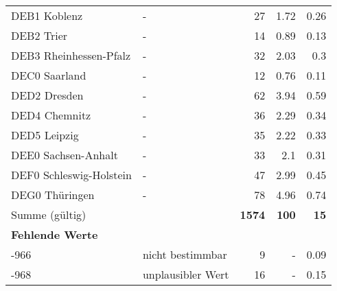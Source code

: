 \begin{longtable}{Xlrrr}
        \multicolumn{1}{X}{DEB1 Koblenz} & - & \num{27} & \num[round-mode=places,round-precision=2]{1.72} & \num[round-mode=places,round-precision=2]{0.26} \\
        \multicolumn{1}{X}{DEB2 Trier} & - & \num{14} & \num[round-mode=places,round-precision=2]{0.89} & \num[round-mode=places,round-precision=2]{0.13} \\
        \multicolumn{1}{X}{DEB3 Rheinhessen-Pfalz} & - & \num{32} & \num[round-mode=places,round-precision=2]{2.03} & \num[round-mode=places,round-precision=2]{0.3} \\
        \multicolumn{1}{X}{DEC0 Saarland} & - & \num{12} & \num[round-mode=places,round-precision=2]{0.76} & \num[round-mode=places,round-precision=2]{0.11} \\
        \multicolumn{1}{X}{DED2 Dresden} & - & \num{62} & \num[round-mode=places,round-precision=2]{3.94} & \num[round-mode=places,round-precision=2]{0.59} \\
        \multicolumn{1}{X}{DED4 Chemnitz} & - & \num{36} & \num[round-mode=places,round-precision=2]{2.29} & \num[round-mode=places,round-precision=2]{0.34} \\
        \multicolumn{1}{X}{DED5 Leipzig} & - & \num{35} & \num[round-mode=places,round-precision=2]{2.22} & \num[round-mode=places,round-precision=2]{0.33} \\
        \multicolumn{1}{X}{DEE0 Sachsen-Anhalt} & - & \num{33} & \num[round-mode=places,round-precision=2]{2.1} & \num[round-mode=places,round-precision=2]{0.31} \\
        \multicolumn{1}{X}{DEF0 Schleswig-Holstein} & - & \num{47} & \num[round-mode=places,round-precision=2]{2.99} & \num[round-mode=places,round-precision=2]{0.45} \\
        \multicolumn{1}{X}{DEG0 Thüringen} & - & \num{78} & \num[round-mode=places,round-precision=2]{4.96} & \num[round-mode=places,round-precision=2]{0.74} \\
     \midrule
      \multicolumn{2}{l}{Summe (gültig)} & \textbf{\num{1574}} &
      \textbf{\num{100}} &
         \textbf{\num[round-mode=places,round-precision=2]{15}} \\
     \multicolumn{5}{l}{\textbf{Fehlende Werte}}\\
       -966 & nicht bestimmbar & \num{9} & - & \num[round-mode=places,round-precision=2]{0.09} \\

       -968 & unplausibler Wert & \num{16} & - & \num[round-mode=places,round-precision=2]{0.15} \\


\end{longtable}

